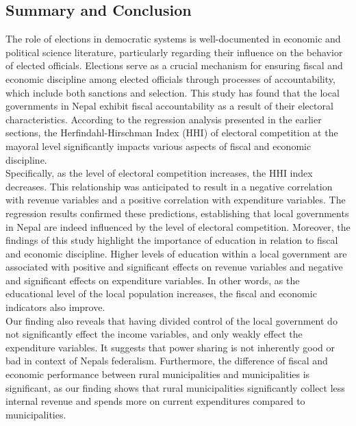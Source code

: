 \subsection{Summary and Conclusion}
The role of elections in democratic systems is well-documented in economic and political science literature, particularly regarding their influence on the behavior of elected officials. Elections serve as a crucial mechanism for ensuring fiscal and economic discipline among elected officials through processes of accountability, which include both sanctions and selection. This study has found that the local governments in Nepal exhibit fiscal accountability as a result of their electoral characteristics. According to the regression analysis presented in the earlier sections, the Herfindahl-Hirschman Index (HHI) of electoral competition at the mayoral level significantly impacts various aspects of fiscal and economic discipline.\\
Specifically, as the level of electoral competition increases, the HHI index decreases. This relationship was anticipated to result in a negative correlation with revenue variables and a positive correlation with expenditure variables. The regression results confirmed these predictions, establishing that local governments in Nepal are indeed influenced by the level of electoral competition. Moreover, the findings of this study highlight the importance of education in relation to fiscal and economic discipline. Higher levels of education within a local government are associated with positive and significant effects on revenue variables and negative and significant effects on expenditure variables. In other words, as the educational level of the local population increases, the fiscal and economic indicators also improve.\\
Our finding also reveals that having divided control of the local government do not significantly effect the income variables, and only weakly effect the expenditure variables. It suggests that power sharing is not inherently good or bad in context of Nepals federalism. Furthermore, the difference of fiscal and economic performance between rural municipalities and municipalities is significant, as our finding shows that rural municipalities significantly collect less internal revenue and spends more on current expenditures compared to municipalities. 


